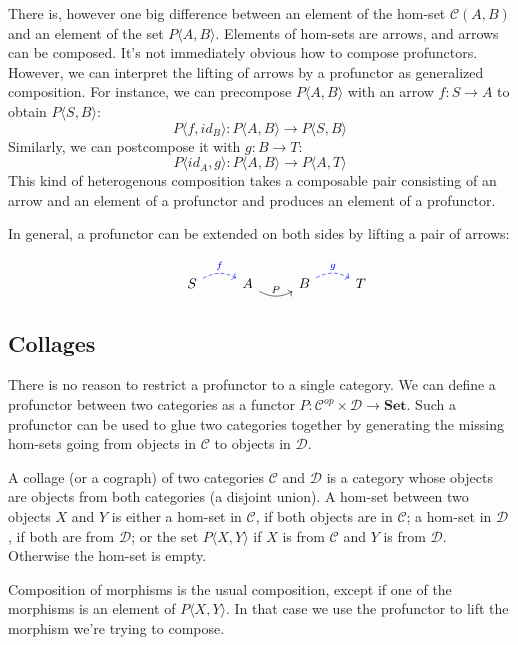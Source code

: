 \documentclass[DaoFP]{subfiles}
\begin{document}
There is, however one big difference between an element of the hom-set $ \mathcal{C}(A, B)$ and an element of the set $P\langle A, B \rangle$. Elements of hom-sets are arrows, and arrows can be composed. It's not immediately obvious how to compose profunctors. However, we can interpret the lifting of arrows by a profunctor as generalized composition. For instance, we can precompose $P \langle A, B \rangle$ with an arrow $f \colon S \to A$ to obtain $P \langle S, B \rangle$:
\[ P\langle f, id_B \rangle \colon P \langle A, B \rangle \to P \langle S, B \rangle \]
Similarly, we can postcompose it with $g \colon B \to T$:
\[ P \langle id_A, g \rangle \colon P \langle A, B \rangle \to P \langle A, T \rangle \]
This kind of heterogenous composition takes a composable pair consisting of an arrow and an element of a profunctor and produces an element of a profunctor.

In general, a profunctor can be extended on both sides by lifting a pair of arrows:

\[
 \begin{tikzcd}
  & S
  \arrow[r, bend left, dashed, blue, "f"]
 & A
 \arrow[r, bend right, "P"]
 & B
  \arrow[r, bend left, dashed, blue, "g"]
 &  T
  \end{tikzcd}
\]

\subsection{Collages}

There is no reason to restrict a profunctor to a single category. We can define a profunctor between two categories as a functor $ P \colon \mathcal{C}^{op} \times  \mathcal{D} \to \mathbf{Set}$. Such a profunctor can be used to glue two categories together by generating the missing hom-sets going from objects in $\mathcal{C}$ to objects in $\mathcal{D}$. 

A collage (or a cograph) of two categories $\mathcal{C}$ and $\mathcal{D}$ is a category whose objects are objects from both categories (a disjoint union). A hom-set between two objects $X$ and $Y$ is either a hom-set in $\mathcal{C}$, if both objects are in $\mathcal{C}$; a hom-set in $\mathcal{D}$, if both are from $\mathcal{D}$; or the set $P \langle X, Y\rangle$ if $X$ is from $\mathcal{C}$ and $Y$ is from $\mathcal{D}$. Otherwise the hom-set is empty. 

Composition of morphisms is the usual composition, except if one of the morphisms is an element of $P \langle X, Y \rangle$. In that case we use the profunctor to lift the morphism we're trying to compose. 
\end{document}
